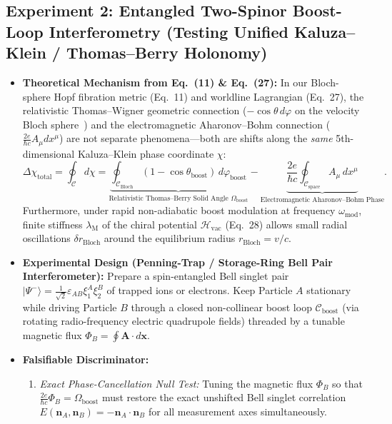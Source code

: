 \documentclass[11pt,a4paper]{article}
\begin{document}
\subsection{Experiment 2: Entangled Two-Spinor Boost-Loop Interferometry (Testing Unified Kaluza--Klein / Thomas--Berry Holonomy)}
\begin{itemize}
    \item \textbf{Theoretical Mechanism from Eq.\ (11) \& Eq.\ (27):}
    In our Bloch-sphere Hopf fibration metric (Eq.\ 11) and worldline Lagrangian (Eq.\ 27), the relativistic Thomas--Wigner geometric connection ($-\cos\theta\,d\varphi$ on the velocity Bloch sphere~\cite{Berry1984,Thomas1926}) and the electromagnetic Aharonov--Bohm connection ($\frac{2e}{\hbar c}A_\mu dx^\mu$) are not separate phenomena---both are shifts along the \emph{same} 5th-dimensional Kaluza--Klein phase coordinate $\chi$:
    \begin{equation}
    \Delta \chi_{\text{total}} = \oint_{\mathcal{C}} d\chi = \underbrace{\oint_{\mathcal{C}_{\text{Bloch}}} (1 - \cos\theta_{\text{boost}})\, d\varphi_{\text{boost}}}_{\text{Relativistic Thomas--Berry Solid Angle }\Omega_{\text{boost}}} - \underbrace{\frac{2e}{\hbar c} \oint_{\mathcal{C}_{\text{space}}} A_\mu\, dx^\mu}_{\text{Electromagnetic Aharonov--Bohm Phase}}.
    \end{equation}
    Furthermore, under rapid non-adiabatic boost modulation at frequency $\omega_{\text{mod}}$, finite stiffness $\lambda_{\text{M}}$ of the chiral potential $\mathcal{H}_{\text{vac}}$ (Eq.\ 28) allows small radial oscillations $\delta r_{\text{Bloch}}$ around the equilibrium radius $r_{\text{Bloch}} = v/c$.
    \item \textbf{Experimental Design (Penning-Trap / Storage-Ring Bell Pair Interferometer):}
    Prepare a spin-entangled Bell singlet pair $|\Psi^-\rangle = \frac{1}{\sqrt{2}}\varepsilon_{AB}\xi_1^A\xi_2^B$ of trapped ions or electrons. Keep Particle $A$ stationary while driving Particle $B$ through a closed non-collinear boost loop $\mathcal{C}_{\text{boost}}$ (via rotating radio-frequency electric quadrupole fields) threaded by a tunable magnetic flux $\Phi_B = \oint \mathbf{A}\cdot d\mathbf{x}$.
    \item \textbf{Falsifiable Discriminator:}
    \begin{enumerate}
        \item \emph{Exact Phase-Cancellation Null Test:} Tuning the magnetic flux $\Phi_B$ so that $\frac{2e}{\hbar c}\Phi_B = \Omega_{\text{boost}}$ must restore the exact unshifted Bell singlet correlation $E(\mathbf{n}_A, \mathbf{n}_B) = -\mathbf{n}_A \cdot \mathbf{n}_B$ for all measurement axes simultaneously.

\end{enumerate}
\end{itemize}
\end{document}
